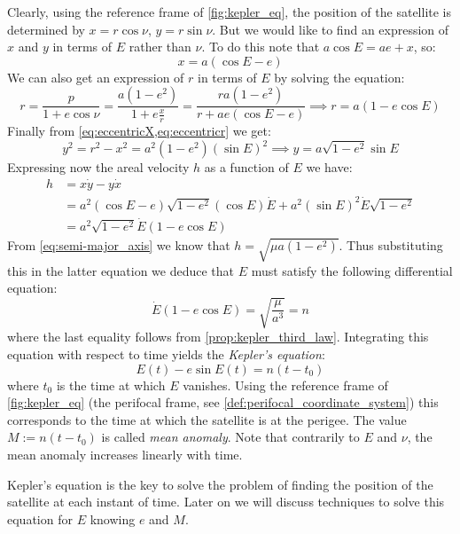 \documentclass[../main.tex]{subfiles}
\begin{document}
Clearly, using the reference frame of \cref{fig:kepler_eq}, the position of the satellite is determined by $x=r\cos\nu$, $y=r\sin\nu$. But we would like to find an expression of $x$ and $y$ in terms of $E$ rather than $\nu$. To do this note that $a\cos E=ae+x$, so:
\begin{equation}\label{eq:eccentricX}
  x=a(\cos E-e)
\end{equation}
We can also get an expression of $r$ in terms of $E$ by solving the equation:
\begin{equation}\label{eq:eccentricr}
  r=\frac{p}{1+e\cos \nu}=\frac{a(1-e^2)}{1+e\frac{x}{r}}=\frac{ra(1-e^2)}{r+ae(\cos E-e)}\implies r= a(1-e\cos E)
\end{equation}
Finally from \cref{eq:eccentricX,eq:eccentricr} we get:
\begin{equation}
  y^2=r^2-x^2=a^2(1-e^2){(\sin E)}^2\implies y=a\sqrt{1-e^2}\sin E
\end{equation}
Expressing now the areal velocity $h$ as a function of $E$ we have:
\begin{align}
  h & =x\dot{y}-y\dot{x}                                                           \\
    & =a^2(\cos E-e)\sqrt{1-e^2}(\cos E)\dot{E}+a^2{(\sin E)}^2\dot{E}\sqrt{1-e^2} \\
    & =a^2\sqrt{1-e^2}\dot{E}(1-e\cos E)
\end{align}
From \cref{eq:semi-major_axis} we know that $h=\sqrt{\mu a(1-e^2)}$. Thus substituting this in the latter equation we deduce that $E$ must satisfy the following differential equation:
\begin{equation}\label{eq:kepler_equation_differential}
  \dot{E}(1-e\cos E)=\sqrt{\frac{\mu}{a^3}}=n
\end{equation}
where the last equality follows from \cref{prop:kepler_third_law}. Integrating this equation with respect to time yields the \emph{Kepler's equation}:
\begin{equation}\label{eq:kepler_equation}
  E(t)-e\sin E(t)=n(t-t_0)
\end{equation}
where $t_0$ is the time at which $E$ vanishes. Using the reference frame of \cref{fig:kepler_eq} (the perifocal frame, see \cref{def:perifocal_coordinate_system}) this corresponds to the time at which the satellite is at the perigee. The value $M:=n(t-t_0)$ is called \emph{mean anomaly}. Note that contrarily to $E$ and $\nu$, the mean anomaly increases linearly with time.

Kepler's equation is the key to solve the problem of finding the position of the satellite at each instant of time. Later on we will discuss techniques to solve this equation for $E$ knowing $e$ and $M$.
\end{document}
